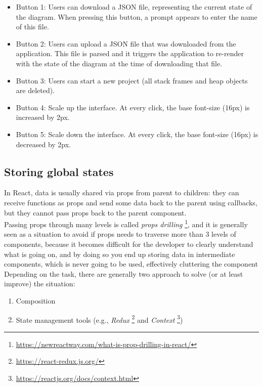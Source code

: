 \documentclass[]{usiinfbachelorproject}
\begin{document}
\begin{itemize}
	\item Button 1: Users can download a JSON file, representing the current state of the diagram. When pressing this button, a prompt appears to enter the name of this file.
	\item Button 2: Users can upload a JSON file that was downloaded from the application. This file is parsed and it triggers the application to re-render with the state of the diagram at the time of downloading that file.
	\item Button 3: Users can start a new project (all stack frames and heap objects are deleted).
	\item Button 4: Scale up the interface. At every click, the base font-size (16px) is increased by 2px.
	\item Button 5: Scale down the interface. At every click, the base font-size (16px) is decreased by 2px.
\end{itemize}

\subsection{Storing global states} \label{storing states}

In React, data is usually shared via props from parent to children: they can receive functions as props and send some data back to the parent using callbacks, but they cannot pass props back to the parent component.\\ Passing props through many levels is called \emph{props drilling} \footnote{\url{https://newreactway.com/what-is-prop-drilling-in-react/}}, and it is generally seen as a situation to avoid if props needs to traverse more than 3 levels of components, because it becomes difficult for the developer to clearly understand what is going on, and by doing so you end up storing data in intermediate components, which is never going to be used, effectively cluttering the component\\

\noindent Depending on the task, there are generally two approach to solve (or at least improve) the situation:

\begin{enumerate}
	\item Composition
	\item State management tools (e.g., \emph{Redux} \footnote{\url{https://react-redux.js.org/}} and \emph{Context} \footnote{\url{https://reactjs.org/docs/context.html}})
\end{enumerate}
\end{document}
